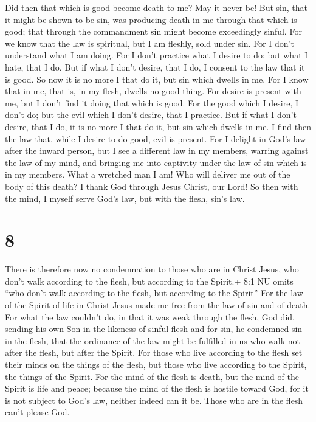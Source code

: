  Did then that which is good become death to me? May it
never be! But sin, that it might be shown to be sin, was producing death
in me through that which is good; that through the commandment sin might
become exceedingly sinful.  For we know that the law is
spiritual, but I am fleshly, sold under sin.  For I don't
understand what I am doing. For I don't practice what I desire to do;
but what I hate, that I do.  But if what I don't desire,
that I do, I consent to the law that it is good.  So now it
is no more I that do it, but sin which dwells in me.  For I
know that in me, that is, in my flesh, dwells no good thing. For desire
is present with me, but I don't find it doing that which is good.
 For the good which I desire, I don't do; but the evil
which I don't desire, that I practice.  But if what I don't
desire, that I do, it is no more I that do it, but sin which dwells in
me.  I find then the law that, while I desire to do good,
evil is present.  For I delight in God's law after the
inward person,  but I see a different law in my members,
warring against the law of my mind, and bringing me into captivity under
the law of sin which is in my members.  What a wretched man
I am! Who will deliver me out of the body of this death?  I
thank God through Jesus Christ, our Lord! So then with the mind, I
myself serve God's law, but with the flesh, sin's law.

\hypertarget{section-7}{%
\section{8}\label{section-7}}

 There is therefore now no condemnation to those who are in
Christ Jesus, who don't walk according to the flesh, but according to
the Spirit.+ 8:1 NU omits ``who don't walk according to the flesh, but
according to the Spirit''  For the law of the Spirit of life
in Christ Jesus made me free from the law of sin and of death.
 For what the law couldn't do, in that it was weak through
the flesh, God did, sending his own Son in the likeness of sinful flesh
and for sin, he condemned sin in the flesh,  that the
ordinance of the law might be fulfilled in us who walk not after the
flesh, but after the Spirit.  For those who live according
to the flesh set their minds on the things of the flesh, but those who
live according to the Spirit, the things of the Spirit.  For
the mind of the flesh is death, but the mind of the Spirit is life and
peace;  because the mind of the flesh is hostile toward God,
for it is not subject to God's law, neither indeed can it be.
 Those who are in the flesh can't please God.

